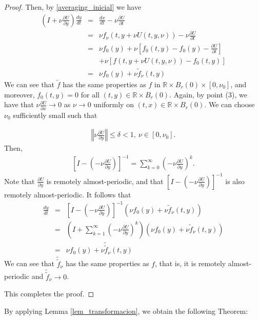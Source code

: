 \documentclass[english,reqno]{amsart}
\numberwithin{equation}{section}
\theoremstyle{plain}
\theoremstyle{definition}
\theoremstyle{remark}
\begin{document}
\begin{proof}
Then, by \eqref{averaging_inicial} we have
\begin{eqnarray*}
\left(I+\nu \frac{\partial U}{\partial y}\right)\frac{dy}{dt}
&=&\frac{dx}{dt}-\nu\frac{\partial U}{\partial t}\\
&=& \nu f_{\nu}(t,y+\nu U(t,y,\nu))-\nu \frac{\partial U}{\partial t}\\
&=& \nu f_{0}(y)+ \nu \left[ f_{0}(t,y)-f_0(y)- \frac{\partial U}{\partial t}\right]\\
& & +\nu \left[ f(t,y+\nu U(t,y,\nu))-f_{0}(t,y)\right]\\
&=& \nu f_0(y)+\nu \tilde{f}_{\nu}(t,y)
\end{eqnarray*}
We can see that $\tilde{f}$ has the same properties as $f$ in $\mathbb{R}\times B_{r}(0)\times[0,\nu_0]$, and moreover, $f_0(t,y)=0$ for all $(t,y)\in\mathbb{R}\times B_{r}(0)$.  
Again, by point (3), we have that $\nu \frac{\partial U}{\partial x}\rightarrow 0$ as $\nu\rightarrow 0$ uniformly on $(t,x)\in \mathbb{R}\times B_{r}(0)$.  
We can choose $\nu_0$ sufficiently small such that

\begin{eqnarray*}
\left\Vert \nu \frac{\partial U}{\partial y}\right\Vert\leq \delta <1,\ \nu\in[0,\nu_0].
\end{eqnarray*}
Then,
\begin{eqnarray*}
\left[I-\left(-\nu \frac{\partial U}{\partial y} \right) \right]^{-1}=\sum_{k=0}^{\infty}\left( -\nu \frac{\partial U}{\partial y}  \right)^k.
\end{eqnarray*}
Note that $\frac{\partial U}{\partial y}$ is remotely almost-periodic, and that $[I - (-\nu \frac{\partial U}{\partial y})]^{-1}$ is also remotely almost-periodic.  
It follows that
\begin{eqnarray*}
\frac{dy}{dt}
&=& \left[I-\left(-\nu \frac{\partial U}{\partial y} \right) \right]^{-1} (\nu f_0(y)+\nu \tilde{f}_{\nu}(t,y))\\
&=& \left(I+\sum_{k=1}^{\infty}\left( -\nu \frac{\partial U}{\partial y}  \right)^k \right)(\nu f_0(y)+\nu \tilde{f}_{\nu}(t,y))\\
&=&\nu f_0(y)+\nu \tilde{\tilde{f}}_{\nu}(t,y)
\end{eqnarray*}
We can see that $\tilde{\tilde{f}}_\nu$ has the same properties as $f$, that is, it is remotely almost-periodic and $\tilde{\tilde{f}}_\nu \rightarrow 0$.

This completes the proof.
\end{proof}

By applying Lemma \ref{lem_transformacion}, we obtain the following Theorem:
\end{document}
